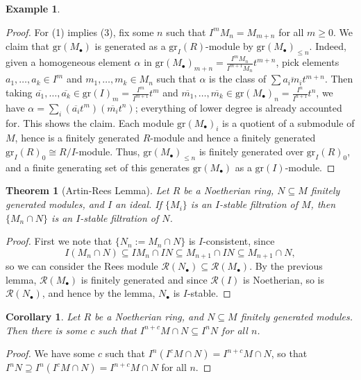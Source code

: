 \documentclass{amsart}[12pt]
\numberwithin{equation}{section}
\theoremstyle{plain} %
\newtheorem{theorem}[equation]{Theorem}
\newtheorem{corollary}[equation]{Corollary}
\theoremstyle{definition}
\newtheorem{ex}[equation]{Example}
\theoremstyle{remark}
\newcommand{\gr}{\mathrm{gr}}
\begin{document}
\begin{ex}
\begin{proof}
For (1) implies (3), fix some $n$ such that $I^m M_n = M_{m+n}$ for all $m\geq 0$. We claim that $\gr(M_\bullet)$ is generated as a $\gr_I(R)$-module by $\gr(M_\bullet)_{\leq n}$. Indeed, given a homogeneous element $\alpha$ in $\displaystyle \gr(M_\bullet)_{m+ n} = \frac{I^m M_n}{I^{m+1} M_n} t^{m+n}$, pick elements $a_1,\dots, a_k \in I^m$ and $m_1,\dots,m_k\in M_n$ such that $\alpha$ is the class of $\sum \overline{a_i m_i} t^{m+n}$. Then taking $\overline{a_1},\dots,\overline{a_k} \in \displaystyle \gr(I)_{m} = \frac{I^m}{I^{m+1}} t^{m}$ and $\overline{m_1},\dots,\overline{m_k} \in \displaystyle \gr(M_\bullet)_{n} = \frac{I^n}{I^{n+1}} t^{n}$, we have $\alpha = \sum_i (\overline{a_i} t^m) (\overline{m_i} t^n)$; everything of lower degree is already accounted for. This shows the claim. Each module $\gr(M_\bullet)_{i}$ is a quotient of a submodule of $M$, hence is a finitely generated $R$-module and hence a finitely generated $\gr_I(R)_0 \cong R/I$-module. Thus, $\gr(M_\bullet)_{\leq n}$ is finitely generated over $\gr_I(R)_0$, and a finite generating set of this generates  $\gr(M_\bullet)$ as a $\gr(I)$-module.
\end{proof}



\begin{theorem}[Artin-Rees Lemma]
	Let $R$ be a Noetherian ring, $N\subseteq M$ finitely generated modules, and $I$ an ideal. If $\{M_i\}$ is an $I$-stable filtration of $M$, then $\{M_n \cap N\}$ is an $I$-stable filtration of $N$.
\end{theorem}
\begin{proof}
First we note that $\{N_n :=M_n \cap N\}$ is $I$-consistent, since 
\[I (M_n \cap N) \subseteq I M_n \cap I N \subseteq M_{n+1} \cap IN \subseteq M_{n+1} \cap N,\]
 so we can consider the Rees module $\mathcal{R}(N_{\bullet}) \subseteq \mathcal{R}(M_{\bullet})$. By the previous lemma, $\mathcal{R}(M_{\bullet})$ is finitely generated and since $\mathcal{R}(I)$ is Noetherian, so is $\mathcal{R}(N_{\bullet})$, and hence by the lemma, $N_{\bullet}$ is $I$-stable.
	\end{proof}

\begin{corollary} Let $R$ be a Noetherian ring, and $N\subseteq M$ finitely generated modules. Then there is some $c$ such that $I^{n+c} M \cap N \subseteq I^n N$ for all $n$.
\end{corollary}
\begin{proof} We have some $c$ such that $I^n(I^c M \cap N) = I^{n+c} M \cap N$, so that $I^n N \supseteq I^n (I^c M \cap N) = I^{n+c} M \cap N$ for all $n$.
\end{proof}


\end{ex}
\end{document}
